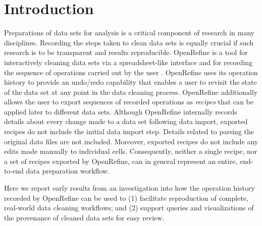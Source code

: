 \section{Introduction}

Preparations of data sets for analysis is a critical component of research in many disciplines. Recording the steps taken to clean data sets is equally crucial if such research is to be transparent and results reproducible. OpenRefine is a tool for interactively cleaning data sets via a spreadsheet-like interface and for recording the sequence of operations carried out by the user \cite{verborgh_using_2013}. 
OpenRefine uses its operation history to provide an undo/redo capability that enables a user to revisit the state of the data set at any point in the data cleaning process. OpenRefine additionally allows the user to export sequences of recorded operations as \emph{recipes} that can be applied later to different data sets. Although OpenRefine internally records details about every change made to a data set following data import, exported recipes do not include the initial data import step. Details related to parsing the original data files are not included. Moreover, exported recipes do not include any edits made manually to individual cells. Consequently, neither a single recipe, nor a set of recipes exported by OpenRefine, can in general represent an entire, end-to-end data preparation workflow. 

Here we report early results from an investigation into how the operation history recorded by OpenRefine can be used to (1) facilitate reproduction of complete, real-world data cleaning workflows; and (2) support queries and visualizations of the provenance of cleaned data sets for easy review.
